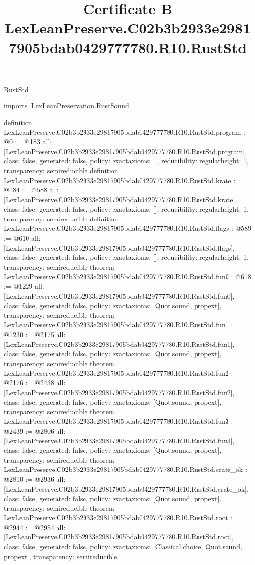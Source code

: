 \begin{lexlean}{RustStd}
\title{Certificate B LexLeanPreserve.C02b3b2933e29817905bdab0429777780.R10.RustStd}
\begin{coremodule}
imports [LexLeanPreservation.RustSound]

definition LexLeanPreserve.C02b3b2933e29817905bdab0429777780.R10.RustStd.program : @0 := @183 {
  all: [LexLeanPreserve.C02b3b2933e29817905bdab0429777780.R10.RustStd.program],
  class: false,
  generated: false,
  policy: exact{axioms: []},
  reducibility: regular{height: 1},
  transparency: semireducible
}
definition LexLeanPreserve.C02b3b2933e29817905bdab0429777780.R10.RustStd.krate : @184 := @588 {
  all: [LexLeanPreserve.C02b3b2933e29817905bdab0429777780.R10.RustStd.krate],
  class: false,
  generated: false,
  policy: exact{axioms: []},
  reducibility: regular{height: 1},
  transparency: semireducible
}
definition LexLeanPreserve.C02b3b2933e29817905bdab0429777780.R10.RustStd.flags : @589 := @610 {
  all: [LexLeanPreserve.C02b3b2933e29817905bdab0429777780.R10.RustStd.flags],
  class: false,
  generated: false,
  policy: exact{axioms: []},
  reducibility: regular{height: 1},
  transparency: semireducible
}
theorem LexLeanPreserve.C02b3b2933e29817905bdab0429777780.R10.RustStd.fun0 : @618 := @1229 {
  all: [LexLeanPreserve.C02b3b2933e29817905bdab0429777780.R10.RustStd.fun0],
  class: false,
  generated: false,
  policy: exact{axioms: [Quot.sound, propext]},
  transparency: semireducible
}
theorem LexLeanPreserve.C02b3b2933e29817905bdab0429777780.R10.RustStd.fun1 : @1230 := @2175 {
  all: [LexLeanPreserve.C02b3b2933e29817905bdab0429777780.R10.RustStd.fun1],
  class: false,
  generated: false,
  policy: exact{axioms: [Quot.sound, propext]},
  transparency: semireducible
}
theorem LexLeanPreserve.C02b3b2933e29817905bdab0429777780.R10.RustStd.fun2 : @2176 := @2438 {
  all: [LexLeanPreserve.C02b3b2933e29817905bdab0429777780.R10.RustStd.fun2],
  class: false,
  generated: false,
  policy: exact{axioms: [Quot.sound, propext]},
  transparency: semireducible
}
theorem LexLeanPreserve.C02b3b2933e29817905bdab0429777780.R10.RustStd.fun3 : @2439 := @2806 {
  all: [LexLeanPreserve.C02b3b2933e29817905bdab0429777780.R10.RustStd.fun3],
  class: false,
  generated: false,
  policy: exact{axioms: [Quot.sound, propext]},
  transparency: semireducible
}
theorem LexLeanPreserve.C02b3b2933e29817905bdab0429777780.R10.RustStd.crate_ok : @2810 := @2936 {
  all: [LexLeanPreserve.C02b3b2933e29817905bdab0429777780.R10.RustStd.crate_ok],
  class: false,
  generated: false,
  policy: exact{axioms: [Quot.sound, propext]},
  transparency: semireducible
}
theorem LexLeanPreserve.C02b3b2933e29817905bdab0429777780.R10.RustStd.root : @2944 := @2954 {
  all: [LexLeanPreserve.C02b3b2933e29817905bdab0429777780.R10.RustStd.root],
  class: false,
  generated: false,
  policy: exact{axioms: [Classical.choice, Quot.sound, propext]},
  transparency: semireducible
}


\end{coremodule}
\end{lexlean}
